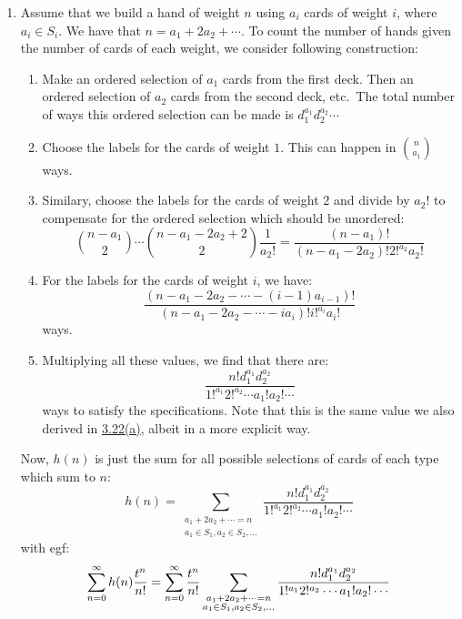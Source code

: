 \begin{solution}
    \begin{enumerate}[label=(\alph*)]
        \item Assume that we build a hand of weight $n$ using $a_i$ cards of weight $i$, where $a_i \in S_i$. We have that $n=a_1 + 2a_2 + \cdots$. To count the number of hands given the number of cards of each weight, we consider following construction:
        \begin{enumerate}[label=(\roman*)]
            \item Make an ordered selection of $a_1$ cards from the first deck. Then an ordered selection of $a_2$ cards from the second deck, etc.\ The total number of ways this ordered selection can be made is $d_1^{a_1}d_2^{a_2}\cdots$
            \item Choose the labels for the cards of weight $1$. This can happen in $\binom{n}{a_1}$ ways.
            \item Similary, choose the labels for the cards of weight $2$ and divide by $a_2!$ to compensate for the ordered selection which should be unordered:
            \[
                \binom{n-a_1}{2}\cdots \binom{n-a_1-2a_2+2}{2} \frac{1}{a_2!} = \frac{(n-a_1)!}{(n-a_1-2a_2)!2!^{a_2}a_2!} 
            \]
            \item For the labels for the cards of weight $i$, we have:
            \[
                \frac{(n-a_1-2a_2-\cdots -(i-1)a_{i-1})!}{(n-a_1-2a_2-\cdots -ia_i)!i!^{a_i}a_i!}
            \]
            ways.
            \item Multiplying all these values, we find that there are:
            \[
                \frac{n!d_1^{a_1}d_2^{a_2}}{1!^{a_1}2!^{a_2}\cdots a_1!a_2!\cdots}
            \]
            ways to satisfy the specifications. Note that this is the same value we also derived in \hyperlink{eq:ch3:22:a}{3.22(a)}, albeit in a more explicit way.
        \end{enumerate}
        Now, $h(n)$ is just the sum for all possible selections of cards of each type which sum to $n$:
        \[
            h(n) = \sum_{\substack{a_1+2a_2+\cdots = n \\ a_1\in S_1, a_2\in S_2,\ldots}}\frac{n!d_1^{a_1}d_2^{a_2}}{1!^{a_1}2!^{a_2}\cdots a_1!a_2!\cdots}
        \]
        with egf:
        \begin{align*}
            \bsum[n] h(n)\frac{t^n}{n!} &= \bsum[n] \frac{t^n}{n!} \sum_{\substack{a_1+2a_2+\cdots = n \\ a_1\in S_1, a_2\in S_2,\ldots}}\frac{n!d_1^{a_1}d_2^{a_2}}{1!^{a_1}2!^{a_2}\cdots a_1!a_2!\cdots}\\

\end{align*}
\end{enumerate}
\end{solution}

